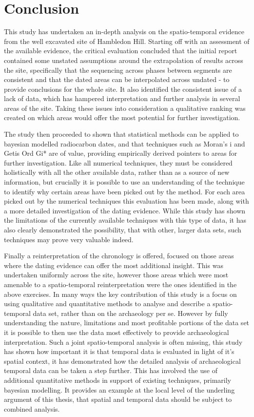 \section{Conclusion}
This study has undertaken an in-depth analysis on the spatio-temporal evidence from the well excavated site of Hambledon Hill. Starting off with an assessment of the available evidence, the critical evaluation concluded that the initial report contained some unstated assumptions around the extrapolation of results across the site, specifically that the sequencing across phases between segments are consistent and that the dated areas can be interpolated across undated - to provide conclusions for the whole site. It also identified the consistent issue of a lack of data, which has hampered interpretation and further analysis in several areas of the site. Taking these issues into consideration a qualitative ranking was created on which areas would offer the most potential for further investigation.

The study then proceeded to shown that statistical methods can be applied to bayesian modelled radiocarbon dates, and that techniques such as Moran's i and Getis Ord Gi* are of value, providing empirically derived pointers to areas for further investigation. Like all numerical techniques, they must be considered holistically with all the other available data, rather than as a source of new information, but crucially it is possible to use an understanding of the technique to identify why certain areas have been picked out by the method. For each area picked out by the numerical techniques this evaluation has been made, along with a more detailed investigation of the dating evidence. While this study has shown the limitations of the currently available techniques with this type of data, it has also clearly demonstrated the possibility, that with other, larger data sets, such techniques may prove very valuable indeed.

Finally a reinterpretation of the chronology is offered, focused on those areas where the dating evidence can offer the most additional insight. This was undertaken uniformly across the site, however those areas which were most amenable to a spatio-temporal reinterpretation were the ones identified in the above exercises. In many ways the key contribution of this study is a focus on using qualitative and quantitative methods to analyse and describe a spatio-temporal data set, rather than on the archaeology per se. However by fully understanding the nature, limitations and most profitable portions of the data set it is possible to then use the data most effectively to provide archaeological interpretation. Such a joint spatio-temporal analysis is often missing, this study has shown how important it is that temporal data is evaluated in light of it's spatial context, it has demonstrated how the detailed analysis of archaeological temporal data can be taken a step further. This has involved the use of additional quantitative methods in support of existing techniques, primarily bayesian modelling. It provides an example at the local level of the underling argument of this thesis, that spatial and temporal data should be subject to combined analysis.